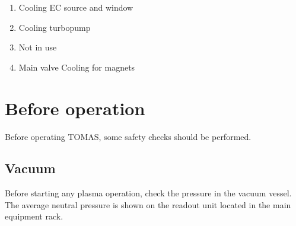 \documentclass[fleqn,a4paper,20pt]{article}
\begin{document}
\begin{enumerate}
	\item Cooling EC source and window
	\item Cooling turbopump
	\item Not in use
	\item Main valve Cooling for magnets
\end{enumerate}

\newpage
\section{Before operation}%


Before operating TOMAS, some safety checks should be performed.

\subsection{Vacuum}

Before starting any plasma operation, check the pressure in the vacuum vessel. 
The average neutral pressure is shown on the readout unit located in the main equipment rack.\\
\end{document}
